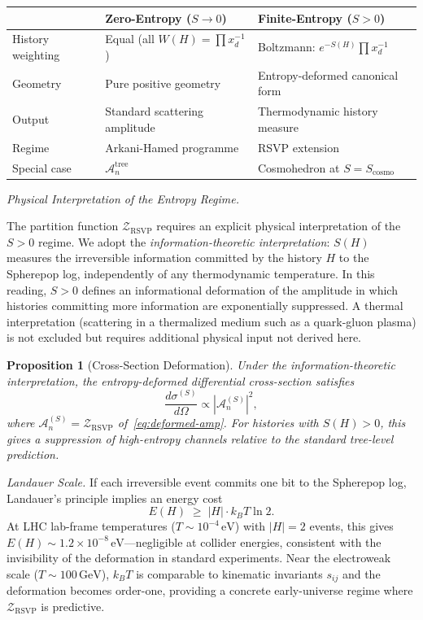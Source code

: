 \documentclass[11pt]{article}
\theoremstyle{plain}
\newtheorem{proposition}[theorem]{Proposition}
\theoremstyle{definition}
\theoremstyle{remark}
\newcommand{\Sf}{S}
\newcommand{\OmKS}{\Omega}
\newcommand{\ZRSVP}{\mathcal{Z}_{\mathrm{RSVP}}}
\begin{document}
\begin{center}
\begin{tabular}{lll}
\toprule
 & Zero-Entropy ($\Sf\to 0$) & Finite-Entropy ($\Sf > 0$) \\
\midrule
History weighting & Equal (all $W(H)=\prod x_d^{-1}$) & Boltzmann: $e^{-\Sf(H)}\prod x_d^{-1}$ \\
Geometry & Pure positive geometry & Entropy-deformed canonical form \\
Output & Standard scattering amplitude & Thermodynamic history measure \\
Regime & Arkani-Hamed programme & RSVP extension \\
Special case & $\mathcal{A}_n^{\mathrm{tree}}$ & Cosmohedron at $\Sf=\Sf_{\mathrm{cosmo}}$ \\
\bottomrule
\end{tabular}
\end{center}

\medskip\noindent\textit{Physical Interpretation of the Entropy Regime.}

The partition function $\ZRSVP$ requires an explicit physical interpretation of the $\Sf > 0$ regime. We adopt the \emph{information-theoretic interpretation}: $\Sf(H)$ measures the irreversible information committed by the history $H$ to the Spherepop log, independently of any thermodynamic temperature. In this reading, $\Sf > 0$ defines an informational deformation of the amplitude in which histories committing more information are exponentially suppressed. A thermal interpretation (scattering in a thermalized medium such as a quark-gluon plasma) is not excluded but requires additional physical input not derived here.

\begin{proposition}[Cross-Section Deformation]
Under the information-theoretic interpretation, the entropy-deformed differential cross-section satisfies
\[
  \frac{d\sigma^{(\Sf)}}{d\OmKS} \propto |\mathcal{A}_n^{(\Sf)}|^2,
\]
where $\mathcal{A}_n^{(\Sf)} = \ZRSVP$ of~\eqref{eq:deformed-amp}. For histories with $\Sf(H) > 0$, this gives a suppression of high-entropy channels relative to the standard tree-level prediction.
\end{proposition}

\medskip\noindent\textit{Landauer Scale.}\quad
If each irreversible event commits one bit to the Spherepop log, Landauer's principle \cite{Landauer1961} implies an energy cost
\[
  E(H) \;\geq\; |H| \cdot k_B T \ln 2.
\]
At LHC lab-frame temperatures ($T \sim 10^{-4}\,\mathrm{eV}$) with $|H|=2$ events, this gives $E(H) \sim 1.2 \times 10^{-8}\,\mathrm{eV}$---negligible at collider energies, consistent with the invisibility of the deformation in standard experiments. Near the electroweak scale ($T \sim 100\,\mathrm{GeV}$), $k_BT$ is comparable to kinematic invariants $s_{ij}$ and the deformation becomes order-one, providing a concrete early-universe regime where $\ZRSVP$ is predictive.
\end{document}
